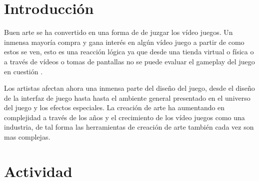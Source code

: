 \section{Introducción}
Buen arte se ha convertido en una forma de de juzgar los vídeo juegos. Un inmensa mayoría compra y gana interés en algún vídeo juego a partir de como estos se ven, esto es una reacción lógica ya que desde una tienda virtual o física o a través de vídeos o tomas de pantallas no se puede evaluar el gameplay del juego en cuestión \cite[p.~171]{bobbatesgamedesign}.

Los artistas afectan ahora una inmensa parte del diseño del juego, desde el diseño de la interfaz de juego hasta hasta el ambiente general presentado en el universo del juego y los efectos especiales. La creación de arte ha aumentando en complejidad a través de los años y el crecimiento de los vídeo juegos como una industria, de tal forma las herramientas de creación de arte también cada vez son mas complejas.
\section{Actividad}
